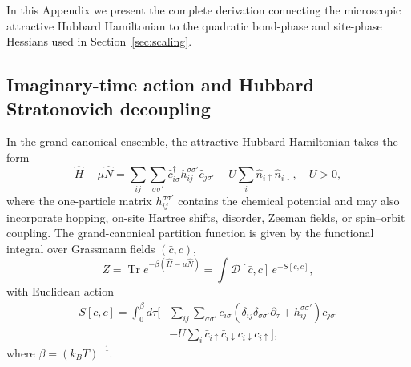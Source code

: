 \documentclass[aps,prb,twocolumn,superscriptaddress,floatfix]{revtex4-2}
\newcommand{\Tr}{\operatorname{Tr}}
\begin{document}
In this Appendix we present the complete derivation connecting the microscopic attractive Hubbard Hamiltonian to the quadratic bond-phase and site-phase Hessians used in Section~\ref{sec:scaling}.

\subsection{Imaginary-time action and Hubbard--Stratonovich decoupling}

In the grand-canonical ensemble, the attractive Hubbard Hamiltonian takes the form
\begin{equation}
\hat{H} - \mu \hat{N} = \sum_{ij}\sum_{\sigma\sigma'} \hat{c}_{i\sigma}^\dagger h_{ij}^{\sigma\sigma'} \hat{c}_{j\sigma'} - U \sum_i \hat{n}_{i\uparrow}\hat{n}_{i\downarrow}, \quad U > 0,
\label{eq:A1}
\end{equation}
where the one-particle matrix $h_{ij}^{\sigma\sigma'}$ contains the chemical potential and may also incorporate hopping, on-site Hartree shifts, disorder, Zeeman fields, or spin--orbit coupling. The grand-canonical partition function is given by the functional integral over Grassmann fields $(\bar{c}, c)$,
\begin{equation}
Z = \Tr e^{-\beta(\hat{H}-\mu\hat{N})} = \int \mathcal{D}[\bar{c},c]\, e^{-S[\bar{c},c]},
\label{eq:A2}
\end{equation}
with Euclidean action
\begin{equation}
\begin{aligned}
S[\bar{c},c] = \int_0^\beta d\tau \Bigg[ & \sum_{ij}\sum_{\sigma\sigma'} \bar{c}_{i\sigma}\left(\delta_{ij}\delta_{\sigma\sigma'}\partial_\tau + h_{ij}^{\sigma\sigma'}\right)c_{j\sigma'} \\
& - U\sum_i \bar{c}_{i\uparrow}\bar{c}_{i\downarrow}c_{i\downarrow}c_{i\uparrow} \Bigg],
\end{aligned}
\label{eq:A3}
\end{equation}
where $\beta = (k_B T)^{-1}$.
\end{document}
